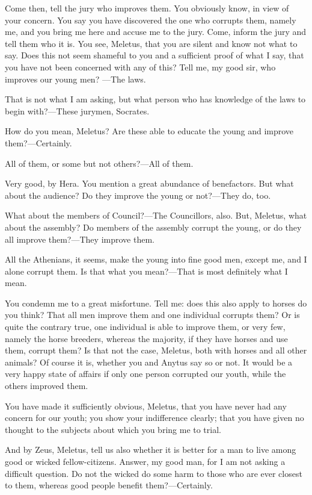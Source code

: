 Come then, tell the jury who improves them. You obviously know, in view of your concern.
You say you have discovered the one who corrupts them, namely me, and you bring me here and
accuse me to the jury. Come, inform the jury and tell them who it is. You see, Meletus, that you
are silent and know not what to say. Does this not seem shameful to you and a sufficient proof of
what I say, that you have not been concerned with any of this? Tell me, my good sir, who improves
our young men? —The laws.

That is not what I am asking, but what person who has knowledge of the laws to begin
with?—These jurymen, Socrates.

How do you mean, Meletus? Are these able to educate the young and improve
them?—Certainly.

All of them, or some but not others?—All of them.

Very good, by Hera. You mention a great abundance of benefactors. But what about the
audience? Do they improve the young or not?—They do, too.

What about the members of Council?—The Councillors, also.
But, Meletus, what about the assembly? Do members of the assembly corrupt the young, or
do they all improve them?—They improve them.

All the Athenians, it seems, make the young into fine good men, except me, and I alone corrupt
them. Is that what you mean?—That is most definitely what I mean.

You condemn me to a great misfortune. Tell me: does this also apply to horses do you think?
That all men improve them and one individual corrupts them? Or is quite the contrary true, one
individual is able to improve them, or very few, namely the horse breeders, whereas the majority,
if they have horses and use them, corrupt them? Is that not the case, Meletus, both with horses and
all other animals? Of course it is, whether you and Anytus say so or not. It would be a very happy
state of affairs if only one person corrupted our youth, while the others improved them.

You have made it sufficiently obvious, Meletus, that you have never had any concern for our
youth; you show your indifference clearly; that you have given no thought to the subjects about
which you bring me to trial.

And by Zeus, Meletus, tell us also whether it is better for a man to live among good or wicked
fellow-citizens. Answer, my good man, for I am not asking a difficult question. Do not the wicked
do some harm to those who are ever closest to them, whereas good people benefit
them?—Certainly.

